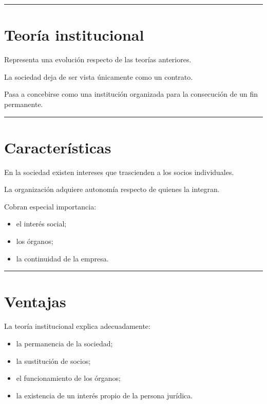 \documentclass[
  spanish,
  letterpaper,
  DIV=11,
  numbers=noendperiod]{scrartcl}
\providecommand{\tightlist}{%
  \setlength{\itemsep}{0pt}\setlength{\parskip}{0pt}}
\begin{document}
\begin{center}\rule{0.5\linewidth}{0.5pt}\end{center}

\section{Teoría institucional}\label{teoruxeda-institucional}

Representa una evolución respecto de las teorías anteriores.

La sociedad deja de ser vista únicamente como un contrato.

Pasa a concebirse como una institución organizada para la consecución de
un fin permanente.

\begin{center}\rule{0.5\linewidth}{0.5pt}\end{center}

\section{Características}\label{caracteruxedsticas-2}

En la sociedad existen intereses que trascienden a los socios
individuales.

La organización adquiere autonomía respecto de quienes la integran.

Cobran especial importancia:

\begin{itemize}
\tightlist
\item
  el interés social;
\item
  los órganos;
\item
  la continuidad de la empresa.
\end{itemize}

\begin{center}\rule{0.5\linewidth}{0.5pt}\end{center}

\section{Ventajas}\label{ventajas}

La teoría institucional explica adecuadamente:

\begin{itemize}
\tightlist
\item
  la permanencia de la sociedad;
\item
  la sustitución de socios;
\item
  el funcionamiento de los órganos;
\item
  la existencia de un interés propio de la persona jurídica.
\end{itemize}
\end{document}
